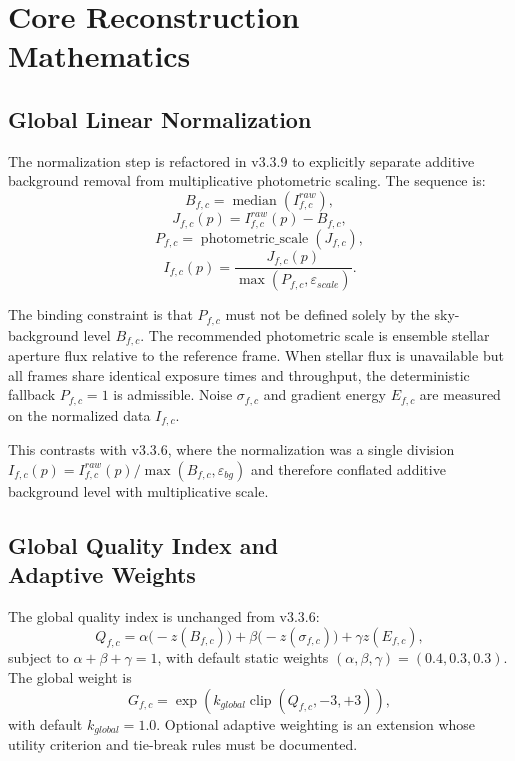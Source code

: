 \documentclass[10pt,twocolumn]{article}
\begin{document}
\section{Core Reconstruction \protect \\Mathematics}

\subsection{Global Linear Normalization}

The normalization step is refactored in v3.3.9 to explicitly separate additive background
removal from multiplicative photometric scaling. The sequence is:
\begin{equation}
  B_{f,c} = \operatorname{median}(I_{f,c}^{raw}),
\end{equation}
\begin{equation}
  J_{f,c}(p) = I_{f,c}^{raw}(p) - B_{f,c},
\end{equation}
\begin{equation}
  P_{f,c} = \operatorname{photometric\_scale}(J_{f,c}),
\end{equation}
\begin{equation}
  I_{f,c}(p) = \frac{J_{f,c}(p)}{\max(P_{f,c},\varepsilon_{scale})}.
\end{equation}

The binding constraint is that $P_{f,c}$ must not be defined solely by the sky-background level
$B_{f,c}$. The recommended photometric scale is ensemble stellar aperture flux relative to the
reference frame. When stellar flux is unavailable but all frames share identical exposure times
and throughput, the deterministic fallback $P_{f,c}=1$ is admissible. Noise $\sigma_{f,c}$ and
gradient energy $E_{f,c}$ are measured on the normalized data $I_{f,c}$.

This contrasts with v3.3.6, where the normalization was a single division
$I_{f,c}(p)=I_{f,c}^{raw}(p)/\max(B_{f,c},\varepsilon_{bg})$ and therefore conflated additive
background level with multiplicative scale.

\subsection{Global Quality Index and \protect \\Adaptive Weights}
\label{sec:qi}

The global quality index is unchanged from v3.3.6:
\begin{equation}
  Q_{f,c} =
  \alpha\bigl(-z(B_{f,c})\bigr) +
  \beta\bigl(-z(\sigma_{f,c})\bigr) +
  \gamma z(E_{f,c}),
\end{equation}
subject to $\alpha+\beta+\gamma=1$, with default static weights
$(\alpha,\beta,\gamma)=(0.4,0.3,0.3)$.
The global weight is
\begin{equation}
  G_{f,c} = \exp(k_{global}\operatorname{clip}(Q_{f,c},-3,+3)),
\end{equation}
with default $k_{global}=1.0$. Optional adaptive weighting is an extension whose utility
criterion and tie-break rules must be documented.
\end{document}
